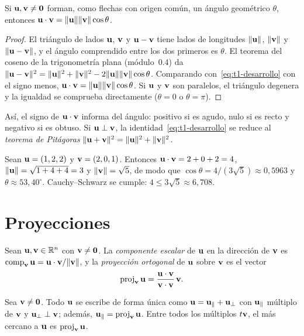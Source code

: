 \begin{proposicion}\label{prop:coseno}
Si $\mathbf{u},\mathbf{v}\neq\mathbf{0}$ forman, como flechas con origen común, un ángulo geométrico $\theta$, entonces $\mathbf{u}\cdot\mathbf{v}=\lVert\mathbf{u}\rVert\lVert\mathbf{v}\rVert\cos\theta$.
\end{proposicion}

\begin{proof}
El triángulo de lados $\mathbf{u}$, $\mathbf{v}$ y $\mathbf{u}-\mathbf{v}$ tiene lados de longitudes $\lVert\mathbf{u}\rVert$, $\lVert\mathbf{v}\rVert$ y $\lVert\mathbf{u}-\mathbf{v}\rVert$, y el ángulo comprendido entre los dos primeros es $\theta$. El teorema del coseno de la trigonometría plana (módulo~0.4) da $\lVert\mathbf{u}-\mathbf{v}\rVert^2=\lVert\mathbf{u}\rVert^2+\lVert\mathbf{v}\rVert^2-2\lVert\mathbf{u}\rVert\lVert\mathbf{v}\rVert\cos\theta$. Comparando con~\eqref{eq:t1-desarrollo} con el signo menos, $\mathbf{u}\cdot\mathbf{v}=\lVert\mathbf{u}\rVert\lVert\mathbf{v}\rVert\cos\theta$. Si $\mathbf{u}$ y $\mathbf{v}$ son paralelos, el triángulo degenera y la igualdad se comprueba directamente ($\theta=0$ o $\theta=\pi$).
\end{proof}

Así, el signo de $\mathbf{u}\cdot\mathbf{v}$ informa del ángulo: positivo si es agudo, nulo si es recto y negativo si es obtuso. Si $\mathbf{u}\perp\mathbf{v}$, la identidad~\eqref{eq:t1-desarrollo} se reduce al \emph{teorema de Pitágoras} $\lVert\mathbf{u}+\mathbf{v}\rVert^2=\lVert\mathbf{u}\rVert^2+\lVert\mathbf{v}\rVert^2$.

\begin{ejemplo}\label{ej:t1-angulo}
Sean $\mathbf{u}=(1,2,2)$ y $\mathbf{v}=(2,0,1)$. Entonces $\mathbf{u}\cdot\mathbf{v}=2+0+2=4$, $\lVert\mathbf{u}\rVert=\sqrt{1+4+4}=3$ y $\lVert\mathbf{v}\rVert=\sqrt5$, de modo que $\cos\theta=4/(3\sqrt5)\approx0{,}5963$ y $\theta\approx53{,}40^\circ$. Cauchy--Schwarz se cumple: $4\le3\sqrt5\approx6{,}708$.
\end{ejemplo}

\section{Proyecciones}

\begin{definicion}\label{def:proyeccion}
Sean $\mathbf{u},\mathbf{v}\in\mathbb{R}^n$ con $\mathbf{v}\neq\mathbf{0}$. La \emph{componente escalar} de $\mathbf{u}$ en la dirección de $\mathbf{v}$ es $\operatorname{comp}_{\mathbf{v}}\mathbf{u}=\mathbf{u}\cdot\mathbf{v}/\lVert\mathbf{v}\rVert$, y la \emph{proyección ortogonal} de $\mathbf{u}$ sobre $\mathbf{v}$ es el vector
\[
\operatorname{proj}_{\mathbf{v}}\mathbf{u}=\frac{\mathbf{u}\cdot\mathbf{v}}{\mathbf{v}\cdot\mathbf{v}}\,\mathbf{v} .
\]
\end{definicion}

\begin{proposicion}\label{prop:descomposicion}
Sea $\mathbf{v}\neq\mathbf{0}$. Todo $\mathbf{u}$ se escribe de forma única como $\mathbf{u}=\mathbf{u}_\parallel+\mathbf{u}_\perp$ con $\mathbf{u}_\parallel$ múltiplo de $\mathbf{v}$ y $\mathbf{u}_\perp\perp\mathbf{v}$; además, $\mathbf{u}_\parallel=\operatorname{proj}_{\mathbf{v}}\mathbf{u}$. Entre todos los múltiplos $t\mathbf{v}$, el más cercano a $\mathbf{u}$ es $\operatorname{proj}_{\mathbf{v}}\mathbf{u}$.
\end{proposicion}

